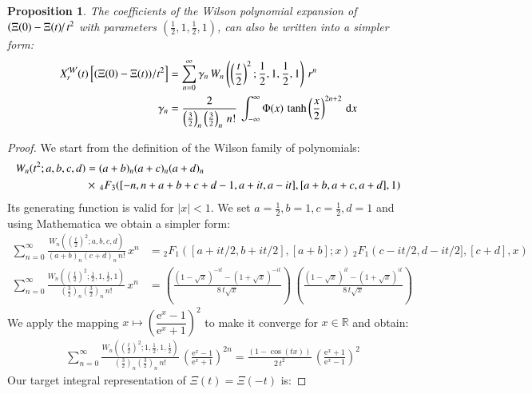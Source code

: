 \documentclass[a4paper,11pt,twoside]{amsart}
\newtheorem{proposition}[theorem]{Proposition}
\newcommand{\verifiedeq}{=}
\newcommand{\defeq}{=}
\newcommand{\verifiedeq}{\stackrel{\checkmark}{=}}
\newcommand{\defeq}{\stackrel{\scriptscriptstyle \textnormal{def}}{=}}
\begin{document}
\begin{proposition}
The coefficients of the Wilson polynomial expansion of $\left(\Xi(0) -\Xi(t)\right/t^2$ with parameters $(\frac12,1,\frac12,1)$, can also be written into a simpler form: \notag \\  
\begin{align}
X^\mathcal{W}_r(t)\left[(\Xi(0)-\Xi(t))/t^2\right] &\verifiedeq \sum_{n=0}^\infty \gamma_n\,W_n\left(\left(\frac{t}{2}\right)^2;\frac12,1,\frac12,1\right)\,r^n \\
\gamma_n &\verifiedeq \frac{2}{\left(\frac32\right)_n\left(\frac32\right)_n\,n!}\,\int_{-\infty}^\infty \Phi(x)\,\tanh\left(\frac{x}{2}\right)^{2n+2}\, \mathrm{d}x \notag
\end{align}
\end{proposition}
\begin{proof}
We start from the definition of the Wilson family of polynomials:
\begin{align}
 W_n(t^2;a,b,c,d) &\defeq (a+b)_n(a+c)_n(a+d)_n\, \\
  &\times\, {}_4F_3([-n, n+ a+b+c+d-1,a+it, a- it], [a+b, a+c, a+d], 1) \notag
\end{align}
Its generating function is valid for $|x| < 1$. We set $a=\frac12,b=1,c=\frac12,d=1$ and using Mathematica we obtain a simpler form: 
\begin{align}
 \sum_{n=0}^\infty \frac{W_n(\left(\frac{t}{2}\right)^2;a,b,c,d)}{(a+b)_n(c+d)_n\,n!}\, x^n &\verifiedeq {}_2F_1\left([a+it/2, b+it/2],[a+b] ;x\right)\,{}_2F_1\left(c-it/2, d-it/2],[c+d],x\right) \\
 \sum_{n=0}^\infty \frac{W_n\left(\left(\frac{t}{2}\right)^2;\frac12,1,\frac12,1\right)}{\left(\frac32\right)_n\left(\frac32\right)_n\,n!}\,x^n&\verifiedeq \left(\frac{(1-\sqrt{x})^{-it}-(1+\sqrt{x})^{-it}}{8\,t\sqrt{x}}\right)\,\left(\frac{(1-\sqrt{x})^{it}-(1+\sqrt{x})^{it}}{8\,t\sqrt{x}}\right)
\end{align} 
We apply the mapping $x \mapsto \left(\dfrac{\textrm{e}^x-1}{\textrm{e}^x+1}\right)^2$ to make it converge for $x \in \mathbb{R}$ and obtain: 
\begin{align}
 &\sum_{n=0}^\infty \frac{W_n\left(\left(\frac{t}{2}\right)^2;1,\frac12,1,\frac12\right)}{\left(\frac32\right)_n\left(\frac32\right)_n\,n!}\, \left(\frac{\textrm{e}^x-1}{\textrm{e}^x+1}\right)^{2n} \verifiedeq \frac{\left(1-\cos(tx)\right)}{2\,t^2}\,\left(\frac{\textrm{e}^x+1}{\textrm{e}^x-1}\right)^2
\end{align}
Our target integral representation of $\Xi(t) = \Xi(-t)$ is:

\end{proof}
\end{document}
